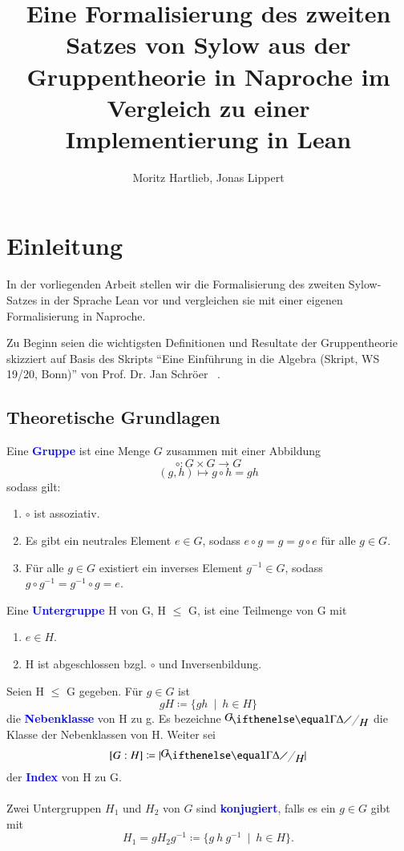 \documentclass[a4paper,12pt]{scrartcl}
\title{Eine Formalisierung des zweiten Satzes von Sylow aus der Gruppentheorie in Naproche im Vergleich zu einer Implementierung in Lean}
\author{Moritz Hartlieb, Jonas Lippert}
\newcommand{\st}{\ \mid\ }
\newcommand{\df}[1]{\textcolor{blue}{\textbf{#1}}}
\begin{document}
\maketitle
\newpage
\tableofcontents
\newpage
{}

\section{Einleitung}

In der vorliegenden Arbeit stellen wir die Formalisierung des zweiten Sylow-Satzes in der Sprache Lean vor und vergleichen sie mit einer eigenen Formalisierung in Naproche.

Zu Beginn seien die wichtigsten Definitionen und Resultate der Gruppentheorie skizziert auf Basis des Skripts \enquote{Eine Einführung in die Algebra
	(Skript, WS 19/20, Bonn)} von Prof. Dr. Jan Schröer ~\cite{bibtex.a}.

\subsection{Theoretische Grundlagen}
	Eine \df{Gruppe} ist eine Menge $G$ zusammen mit einer Abbildung $$\circ: G\times G\to G$$ $$(g,h) \mapsto g\circ h = gh$$ sodass gilt:
	\begin{enumerate}
		\item $\circ$ ist assoziativ.
		\item Es gibt ein neutrales Element $e\in G$, sodass $e\circ g=g=g\circ e$ für alle $g\in G$.
		\item Für alle $g\in G$ existiert ein inverses Element $g^{-1}\in G$, sodass $g\circ g^{-1}=g^{-1}\circ g=e$. 
	\end{enumerate}
	
	Eine \df{Untergruppe} H von G, H $\leq$ G, ist eine Teilmenge von G mit
	\begin{enumerate}
		\item $e\in H$.
		\item H ist abgeschlossen bzgl. $\circ$ und Inversenbildung.
	\end{enumerate}
	
	Seien H $\leq$ G gegeben. Für $g \in G$ ist $$gH\coloneqq\{gh\st h\in H\}$$ die \df{Nebenklasse} von H zu g. Es bezeichne $\fkr{G}{H}$ die Klasse der Nebenklassen von H. Weiter sei $$[G : H] \coloneqq |\fkr{G}{H}|$$ der \df{Index} von H zu G.\\\\
	Zwei Untergruppen $H_{1}$ und $H_{2}$ von $G$ sind \df{konjugiert}, falls es ein $g\in G$ gibt
	mit $$H_{1}=gH_{2}g^{-1}\coloneqq \{g\ h\ g^{-1}\st h\in H\}.$$
	
\end{document}
